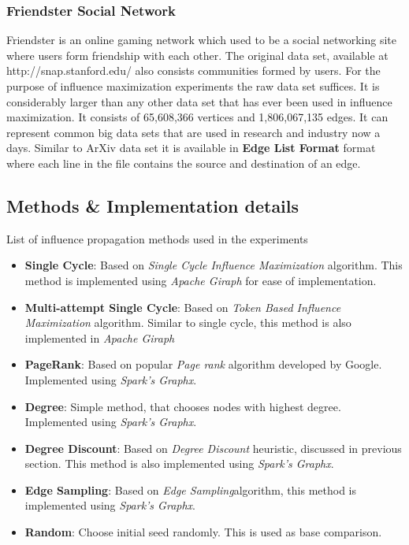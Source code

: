 \documentclass[english]{tktltiki}
\begin{document}
\subsubsection{Friendster Social Network}
Friendster is an online gaming network which used to be a social networking site where users form friendship with each other. The original data set, available at http://snap.stanford.edu/ also consists communities formed by users. For the purpose of influence maximization experiments the raw data set suffices. It is considerably larger than any other data set that has ever been used in influence maximization. It consists of 65,608,366 vertices and 1,806,067,135 edges. It can represent common big data sets that are used in research and industry now a days. Similar to ArXiv data set it is available in \textbf{Edge List Format} format where each line in the file contains the source and destination of an edge.


\subsection{Methods \& Implementation details}
List of influence propagation methods used in the experiments
\begin{itemize}
\item \textbf{Single Cycle}: Based on \textit{Single Cycle Influence Maximization} algorithm. This method is implemented using \textit{Apache Giraph} for ease of implementation.
\item \textbf{Multi-attempt Single Cycle}: Based on \textit{Token Based Influence Maximization} algorithm. Similar to single cycle, this method is also implemented in \textit{Apache Giraph}
\item \textbf{PageRank}: Based on popular \textit{Page rank} algorithm developed by Google. Implemented using \textit{Spark's Graphx}.
\item \textbf{Degree}: Simple method, that chooses nodes with highest degree. Implemented using \textit{Spark's Graphx}.
\item \textbf{Degree Discount}: Based on \textit{Degree Discount} heuristic, discussed in previous section. This method is also implemented using \textit{Spark's Graphx}.
\item \textbf{Edge Sampling}: Based on \textit{Edge Sampling}algorithm, this method is implemented using \textit{Spark's Graphx}.
\item \textbf{Random}: Choose initial seed randomly. This is used as base comparison. 
\end{itemize}
\end{document}

